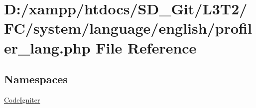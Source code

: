 \hypertarget{profiler__lang_8php}{}\section{D\+:/xampp/htdocs/\+S\+D\+\_\+\+Git/\+L3\+T2/\+F\+C/system/language/english/profiler\+\_\+lang.php File Reference}
\label{profiler__lang_8php}
\subsection*{Namespaces}
\begin{DoxyCompactItemize}
\item 
 \hyperlink{namespace_code_igniter}{Code\+Igniter}
\end{DoxyCompactItemize}
